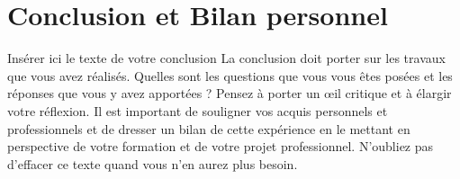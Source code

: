 \chapter*{Conclusion et Bilan personnel}

Insérer ici le texte de votre conclusion
La conclusion doit porter sur les travaux que vous avez réalisés. Quelles sont  les questions que vous vous êtes posées et les réponses que vous y avez apportées ? Pensez à porter un œil critique et à élargir votre réflexion.
Il est important de souligner vos acquis personnels et professionnels et de dresser un bilan de cette expérience en le mettant en perspective de votre formation et de votre projet professionnel.
N’oubliez pas d’effacer ce texte quand vous n’en aurez plus besoin.
